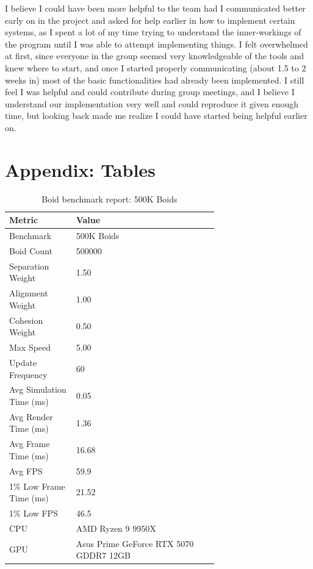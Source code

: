 \documentclass[a4paper, 12pt]{article}
\begin{document}
I believe I could have been more helpful to the team had I communicated better early on in the project
and asked for help earlier in how to implement certain systems, as I spent a lot of my time trying
to understand the inner-workings of the program until I was able to attempt implementing things. I
felt overwhelmed at first, since everyone in the group seemed very knowledgeable of the tools and
knew where to start, and once I started properly communicating (about 1.5 to 2 weeks in) most of the
basic functionalities had already been implemented. I still feel I was helpful and could contribute
during group meetings, and I believe I understand our implementation very well and could reproduce it
given enough time, but looking back made me realize I could have started being helpful earlier on.

\break
\nocite{*}
\printbibliography

\break
\appendix
\section{Appendix: Tables}
\label{appendix:tables}

\begin{table}[htbp]
\centering
{}
\begin{tabular}{l p{0.68\linewidth}}
\hline
Metric & Value \\
\hline
Benchmark & 500K Boids \\
Boid Count & 500000 \\
Separation Weight & 1.50 \\
Alignment Weight & 1.00 \\
Cohesion Weight & 0.50 \\
Max Speed & 5.00 \\
Update Frequency & 60 \\
Avg Simulation Time (ms) & 0.05 \\
Avg Render Time (ms) & 1.36 \\
Avg Frame Time (ms) & 16.68 \\
Avg FPS & 59.9 \\
1\% Low Frame Time (ms) & 21.52 \\
1\% Low FPS & 46.5 \\
CPU & AMD Ryzen 9 9950X\\
GPU & Asus Prime GeForce RTX 5070 GDDR7 12GB\\
\hline
\end{tabular}
\caption{Boid benchmark report: 500K Boids}
\label{tab:boid-benchmark-report-500K-standard}
\end{table}
\end{document}
